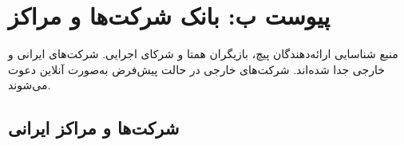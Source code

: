 \documentclass[a4paper,12pt]{article}
\begin{document}
	\newpage
	\section*{پیوست ب: بانک شرکت‌ها و مراکز}

	{\small\color{mci-gray}
	منبع شناسایی ارائه‌دهندگان پیچ، بازیگران همتا و شرکای اجرایی. شرکت‌های ایرانی و خارجی جدا شده‌اند.
	شرکت‌های خارجی در حالت پیش‌فرض به‌صورت آنلاین دعوت می‌شوند.}

	\vspace{4pt}

	\subsection*{شرکت‌ها و مراکز ایرانی}
\end{document}

